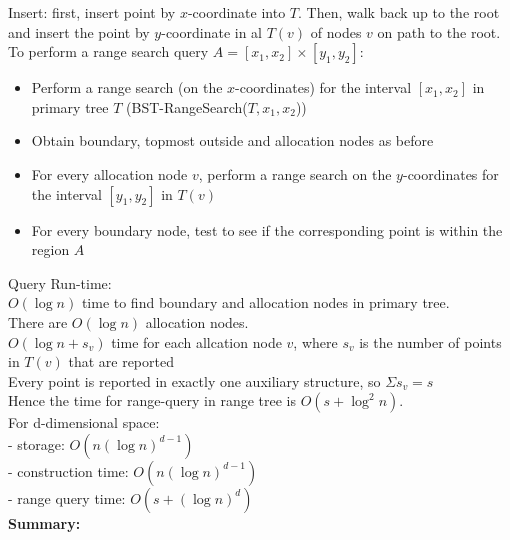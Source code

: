 \documentclass[12pt]{article}
\begin{document}
{Insert: first, insert point by $x$-coordinate into $T$. Then, walk back up to the root and insert the point by $y$-coordinate in al $T(v)$ of nodes $v$ on path to the root. \\

To perform a range search query $A = [x_1,x_2] \times [y_1,y_2]$:
\begin{itemize}
	\renewcommand\labelitemi{--}
	\item Perform a range search (on the $x$-coordinates) for the interval $[x_1,x_2]$ in primary tree $T$ (BST-RangeSearch($T,x_1,x_2$))
	\item Obtain boundary, topmost outside and allocation nodes as before
	\item For every allocation node $v$, perform a range search on the $y$-coordinates for the interval $[y_1,y_2]$ in $T(v)$
	\item For every boundary node, test to see if the corresponding point is within the region $A$
\end{itemize}
Query Run-time:\\
$O(\log n)$ time to find boundary and allocation nodes in primary tree.\\
There are $O(\log n)$ allocation nodes.\\
$O(\log n + s_v)$ time for each allcation node $v$, where $s_v$ is the number of points in $T(v)$ that are reported\\
Every point is reported in exactly one auxiliary structure, so $\Sigma s_v = s$\\
Hence the time for range-query in range tree is $O(s + \log^2 n)$.\\

For d-dimensional space:\\
- storage: $O(n(\log n)^{d-1})$\\
- construction time: $O(n(\log n)^{d-1})$\\
- range query time: $O(s + (\log n)^d)$\\

\textbf{Summary:}\\

}
\end{document}

